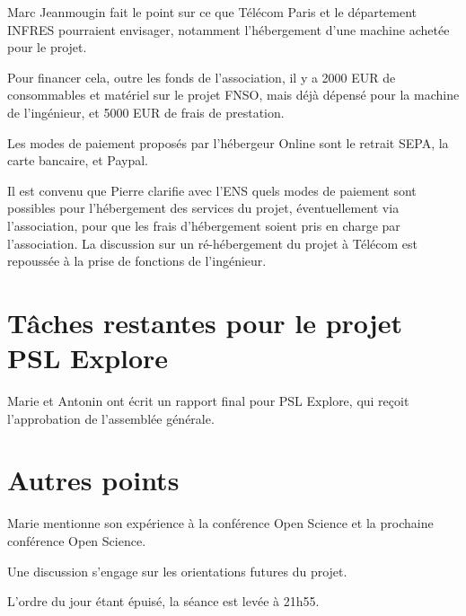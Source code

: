 \documentclass[a4paper]{article}
\begin{document}
Marc Jeanmougin fait le point sur ce que Télécom Paris et le département INFRES
pourraient envisager, notamment l'hébergement d'une machine achetée pour le
projet.

Pour financer cela, outre les fonds de l'association, il y a 2000 EUR de
consommables et matériel sur le projet FNSO, mais déjà dépensé pour la machine
de l'ingénieur, et 5000 EUR de frais de prestation.

Les modes de paiement proposés par l'hébergeur Online sont le retrait SEPA, la
carte bancaire, et Paypal.

Il est convenu que Pierre clarifie avec l'ENS quels modes de paiement sont
possibles pour l'hébergement des services du projet, éventuellement via
l'association, pour que les frais d'hébergement soient pris en charge par
l'association. La discussion sur un ré-hébergement du projet à Télécom est
repoussée à la prise de fonctions de l'ingénieur.

\section{Tâches restantes pour le projet PSL Explore}

Marie et Antonin ont écrit un rapport final pour PSL Explore, qui reçoit
l'approbation de l'assemblée générale.

\section{Autres points}

Marie mentionne son expérience à la conférence Open Science et la prochaine
conférence Open Science.

Une discussion s'engage sur les orientations futures du projet.

\bigskip

L'ordre du jour étant épuisé, la séance est levée à 21h55.
\end{document}
